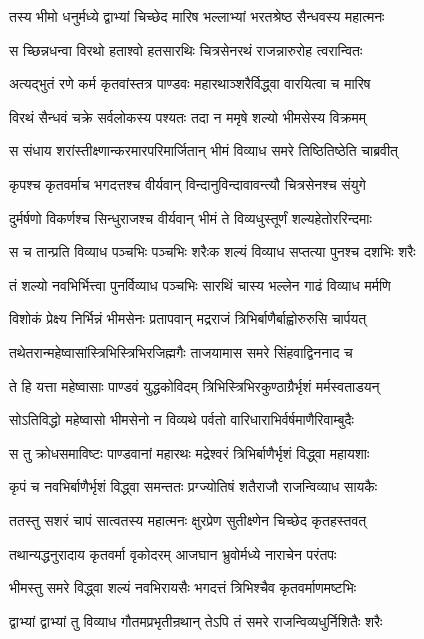 \twolineshloka
{तस्य भीमो धनुर्मध्ये द्वाभ्यां चिच्छेद मारिष}
{भल्लाभ्यां भरतश्रेष्ठ सैन्धवस्य महात्मनः}


\twolineshloka
{स च्छिन्नधन्वा विरथो हताश्वो हतसारथिः}
{चित्रसेनरथं राजन्नारुरोह त्वरान्वितः}


\twolineshloka
{अत्यद्भुतं रणे कर्म कृतवांस्तत्र पाण्डवः}
{महारथाञ्शरैर्विद्ध्वा वारयित्वा च मारिष}


\twolineshloka
{विरथं सैन्धवं चक्रे सर्वलोकस्य पश्यतः}
{तदा न ममृषे शल्यो भीमसेस्य विक्रमम्}


\twolineshloka
{स संधाय शरांस्तीक्ष्णान्करमारपरिमार्जितान्}
{भीमं विव्याध समरे तिष्ठितिष्ठेति चाब्रवीत्}


\twolineshloka
{कृपश्च कृतवर्माच भगदत्तश्च वीर्यवान्}
{विन्दानुविन्दावावन्त्यौ चित्रसेनश्च संयुगे}


\twolineshloka
{दुर्मर्षणो विकर्णश्च सिन्धुराजश्च वीर्यवान्}
{भीमं ते विव्यधुस्तूर्णं शल्यहेतोररिन्दमाः}


\twolineshloka
{स च तान्प्रति विव्याध पञ्चभिः पञ्चभिः शरैःक}
{शल्यं विव्याध सप्तत्या पुनश्च दशभिः शरैः}


\twolineshloka
{तं शल्यो नवभिर्भित्त्वा पुनर्विव्याध पञ्चभिः}
{सारथिं चास्य भल्लेन गाढं विव्याध मर्मणि}


\twolineshloka
{विशोकं प्रेक्ष्य निर्भिन्नं भीमसेनः प्रतापवान्}
{मद्रराजं त्रिभिर्बाणैर्बाह्वोरुरुसि चार्पयत्}


\twolineshloka
{तथेतरान्महेष्वासांस्त्रिभिस्त्रिभिरजिह्मगैः}
{ताजयामास समरे सिंहवाद्विननाद च}


\twolineshloka
{ते हि यत्ता महेष्वासाः पाण्डवं युद्धकोविदम्}
{त्रिभिस्त्रिभिरकुण्ठाग्रैर्भृशं मर्मस्वताडयन्}


\twolineshloka
{सोऽतिविद्धो महेष्वासो भीमसेनो न विव्यथे}
{पर्वतो वारिधाराभिर्वर्षमाणैरिवाम्बुदैः}


\twolineshloka
{स तु क्रोधसमाविष्टः पाण्डवानां महारथः}
{मद्रेश्वरं त्रिभिर्बाणैर्भृशं विद्ध्वा महायशाः}


\twolineshloka
{कृपं च नवभिर्बाणैर्भृशं विद्ध्वा समन्ततः}
{प्रग्ज्योतिषं शतैराजौ राजन्विव्याध सायकैः}


\twolineshloka
{ततस्तु सशरं चापं सात्वतस्य महात्मनः}
{क्षुरप्रेण सुतीक्ष्णेन चिच्छेद कृतहस्तवत्}


\twolineshloka
{तथान्यद्धनुरादाय कृतवर्मा वृकोदरम्}
{आजघान भ्रुवोर्मध्ये नाराचेन परंतपः}


\twolineshloka
{भीमस्तु समरे विद्ध्वा शल्यं नवभिरायसैः}
{भगदत्तं त्रिभिश्चैव कृतवर्माणमष्टभिः}


\twolineshloka
{द्वाभ्यां द्वाभ्यां तु विव्याध गौतमप्रभृतीन्रथान्}
{तेऽपि तं समरे राजन्विव्यधुर्निशितैः शरैः}


